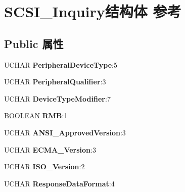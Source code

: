 \hypertarget{struct_s_c_s_i___inquiry}{}\section{S\+C\+S\+I\+\_\+\+Inquiry结构体 参考}
\label{struct_s_c_s_i___inquiry}
\subsection*{Public 属性}
\begin{DoxyCompactItemize}
\item 
\mbox{\label{struct_s_c_s_i___inquiry_a550b0c8330049e76ebd625c7bec34726}} 
U\+C\+H\+AR {\bfseries Peripheral\+Device\+Type}\+:5
\item 
\mbox{\label{struct_s_c_s_i___inquiry_a18388bd53e0934d02f88d5cc38518404}} 
U\+C\+H\+AR {\bfseries Peripheral\+Qualifier}\+:3
\item 
\mbox{\label{struct_s_c_s_i___inquiry_a02bddfed23b21e3c3e6dcb612738cd29}} 
U\+C\+H\+AR {\bfseries Device\+Type\+Modifier}\+:7
\item 
\mbox{\label{struct_s_c_s_i___inquiry_a967da8765da0bdb5b441b54ef298c4d3}} 
\hyperlink{_processor_bind_8h_a112e3146cb38b6ee95e64d85842e380a}{B\+O\+O\+L\+E\+AN} {\bfseries R\+MB}\+:1
\item 
\mbox{\label{struct_s_c_s_i___inquiry_acf0981110b5ae0cc68f3591bed742e27}} 
U\+C\+H\+AR {\bfseries A\+N\+S\+I\+\_\+\+Approved\+Version}\+:3
\item 
\mbox{\label{struct_s_c_s_i___inquiry_aaa1df69857f600fdb3ed7640c1c8d66c}} 
U\+C\+H\+AR {\bfseries E\+C\+M\+A\+\_\+\+Version}\+:3
\item 
\mbox{\label{struct_s_c_s_i___inquiry_a9567eb5843a6855e2ac29dc12f5da81f}} 
U\+C\+H\+AR {\bfseries I\+S\+O\+\_\+\+Version}\+:2
\item 
\mbox{\label{struct_s_c_s_i___inquiry_a9f0f52669d35590309516054a4b66ec3}} 
U\+C\+H\+AR {\bfseries Response\+Data\+Format}\+:4

\end{DoxyCompactItemize}
